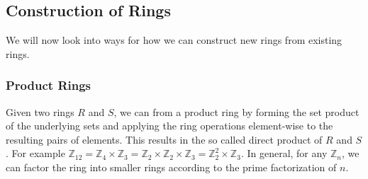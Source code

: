 







\subsection{Construction of Rings}
We will now look into ways for how we can construct new rings from existing rings. 


\subsubsection{Product Rings}
Given two rings $R$ and $S$, we can from a product ring by forming the set product of the underlying sets and applying the ring operations element-wise to the resulting pairs of elements. This results in the so called direct product of $R$ and $S$. For example $\mathbb{Z}_{12} = \mathbb{Z}_4 \times \mathbb{Z}_3 = \mathbb{Z}_2 \times \mathbb{Z}_2 \times \mathbb{Z}_3 = \mathbb{Z}_2^2 \times \mathbb{Z}_3$. In general, for any $\mathbb{Z}_n$, we can factor the ring into smaller rings according to the prime factorization of $n$.

